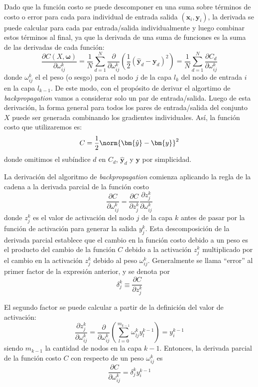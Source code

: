 Dado que la función costo se puede descomponer en una suma sobre términos de costo o error para cada para individual de entrada salida $(\bm{x}_i, \bm{y}_i)$, la derivada se puede calcular para cada par entrada/salida individualmente y luego combinar estos términos al final, ya que la derivada de una suma de funciones es la suma de las derivadas de cada función:
\[ \frac{\partial C(X, \bm{\omega})}{\partial \omega_{ij}^k} = \frac{1}{N} \sum_{d=1}^N \frac{\partial}{\partial \omega_{ij}^k} \left(\dfrac{1}{2}(\bm{\hat{y}}_d - \bm{y}_d)^2\right) = \frac{1}{N} \sum_{d=1}^N \frac{\partial C_d}{\partial \omega_{ij}^k} \]
donde $\omega_{ij}^k$ el el peso (o sesgo) para el nodo $j$ de la capa $l_k$ del nodo de entrada $i$ en la capa $l_{k-1}$. De este modo, con el propósito de derivar el algortimo de \textit{backpropagation} vamos a considerar solo un par de entrada/salida. Luego de esta derivación, la forma general para todos los pares de entrada/salida del conjunto $X$ puede ser generada combinando los gradientes individuales. Así, la función costo que utilizaremos es:
\[ C = \frac{1}{2}\norm{\bm{\hat{y}} - \bm{y}}^2 \]
donde omitimos el subíndice $d$ en $C_d$, $\bm{\hat{y}}_d$ y $\bm{y}$ por simplicidad.

La derivación del algoritmo de \textit{backpropagation} comienza aplicando la regla de la cadena a la derivada parcial de la función costo
\[ \frac{\partial C}{\partial \omega_{ij}^k} = \frac{\partial C}{\partial z_j^k} \frac{\partial z_j^k}{\partial \omega_{ij}^k} \]
donde $z_j^k$ es el valor de activación del nodo $j$ de la capa $k$ antes de pasar por la función de activación para generar la salida $y_j^k$. Esta descomposición de la derivada parcial establece que el cambio en la función costo debido a un peso es el producto del cambio de la función $C$ debido a la activación $z_j^k$ multiplicado por el cambio en la activación $z_j^k$ debido al peso $\omega_{ij}^k$. Generalmente se llama ``error'' al primer factor de la expresión anterior, y se denota por
\[ \delta_j^k \equiv \frac{\partial C}{\partial z_j^k} \]

El segundo factor se puede calcular a partir de la definición del valor de activación:
\[ \frac{\partial z_j^k}{\partial \omega_{ij}^k} = \frac{\partial}{\partial \omega_{ij}^k} \left(\sum_{l=0}^{m_{k-1}} \omega_{lj}^k y_l^{k-1}\right) = y_i^{k-1} \]
siendo $m_{k-1}$ la cantidad de nodos en la capa $k-1$. Entonces, la derivada parcial de la función costo $C$ con respecto de un peso $\omega_{ij}^k$ es 
\[ \frac{\partial C}{\partial \omega_{ij}^k} = \delta_j^k y_i^{k-1} \]


